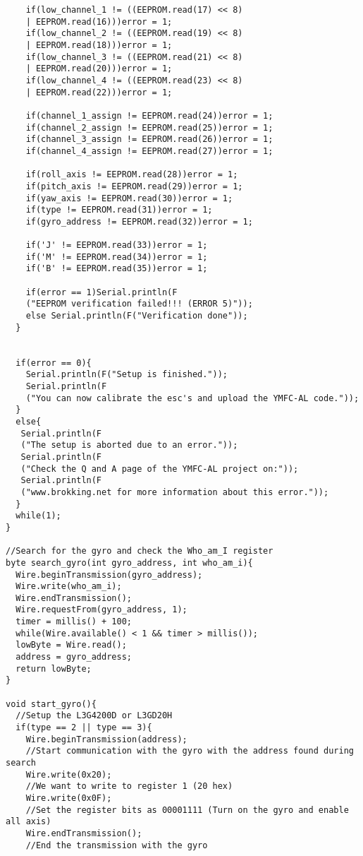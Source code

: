 \begin{lstlisting}
    if(low_channel_1 != ((EEPROM.read(17) << 8) 
    | EEPROM.read(16)))error = 1;
    if(low_channel_2 != ((EEPROM.read(19) << 8) 
    | EEPROM.read(18)))error = 1;
    if(low_channel_3 != ((EEPROM.read(21) << 8) 
    | EEPROM.read(20)))error = 1;
    if(low_channel_4 != ((EEPROM.read(23) << 8) 
    | EEPROM.read(22)))error = 1;
    
    if(channel_1_assign != EEPROM.read(24))error = 1;
    if(channel_2_assign != EEPROM.read(25))error = 1;
    if(channel_3_assign != EEPROM.read(26))error = 1;
    if(channel_4_assign != EEPROM.read(27))error = 1;
    
    if(roll_axis != EEPROM.read(28))error = 1;
    if(pitch_axis != EEPROM.read(29))error = 1;
    if(yaw_axis != EEPROM.read(30))error = 1;
    if(type != EEPROM.read(31))error = 1;
    if(gyro_address != EEPROM.read(32))error = 1;
    
    if('J' != EEPROM.read(33))error = 1;
    if('M' != EEPROM.read(34))error = 1;
    if('B' != EEPROM.read(35))error = 1;
  
    if(error == 1)Serial.println(F
    ("EEPROM verification failed!!! (ERROR 5)"));
    else Serial.println(F("Verification done"));
  }
  
  
  if(error == 0){
    Serial.println(F("Setup is finished."));
    Serial.println(F
    ("You can now calibrate the esc's and upload the YMFC-AL code."));
  }
  else{
   Serial.println(F
   ("The setup is aborted due to an error."));
   Serial.println(F
   ("Check the Q and A page of the YMFC-AL project on:"));
   Serial.println(F
   ("www.brokking.net for more information about this error."));
  }
  while(1);
}

//Search for the gyro and check the Who_am_I register
byte search_gyro(int gyro_address, int who_am_i){
  Wire.beginTransmission(gyro_address);
  Wire.write(who_am_i);
  Wire.endTransmission();
  Wire.requestFrom(gyro_address, 1);
  timer = millis() + 100;
  while(Wire.available() < 1 && timer > millis());
  lowByte = Wire.read();
  address = gyro_address;
  return lowByte;
}

void start_gyro(){
  //Setup the L3G4200D or L3GD20H
  if(type == 2 || type == 3){
    Wire.beginTransmission(address);                             
    //Start communication with the gyro with the address found during search
    Wire.write(0x20);                                            
    //We want to write to register 1 (20 hex)
    Wire.write(0x0F);                                            
    //Set the register bits as 00001111 (Turn on the gyro and enable all axis)
    Wire.endTransmission();                                      
    //End the transmission with the gyro


\end{lstlisting}
